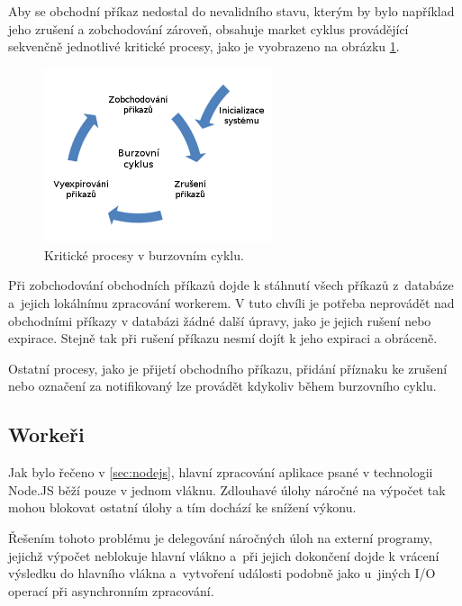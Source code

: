 \documentclass[thesis=M,czech]{FITthesis}[2012/06/26]
\begin{document}
	Aby se obchodní příkaz nedostal do nevalidního stavu, kterým by bylo například jeho zrušení a zobchodování zároveň, obsahuje market cyklus provádějící sekvenčně jednotlivé kritické procesy, jako je vyobrazeno na obrázku \ref{fig:stock_cycle}.
	 
	 
\begin{figure}[h]
	\centering
	\includegraphics[width=0.6\textwidth]{images/stock_cycle}
 	\caption[Burzovní cyklus]{Kritické procesy v burzovním cyklu.}
 	\label{fig:stock_cycle}
\end{figure}

	Při zobchodování obchodních příkazů dojde k stáhnutí všech příkazů z~databáze a~jejich lokálnímu zpracování workerem. V tuto chvíli je potřeba neprovádět nad obchodními příkazy v databázi žádné další úpravy, jako je jejich rušení nebo expirace. Stejně tak při rušení příkazu nesmí dojít k jeho expiraci a obráceně.
	
	Ostatní procesy, jako je přijetí obchodního příkazu, přidání příznaku ke zrušení nebo označení za notifikovaný lze provádět kdykoliv během burzovního cyklu.
	
\subsection{Workeři}

	Jak bylo řečeno v \ref{sec:nodejs}, hlavní zpracování aplikace psané v technologii Node.JS běží pouze v jednom vláknu. Zdlouhavé úlohy náročné na výpočet tak mohou blokovat ostatní úlohy a tím dochází ke snížení výkonu.
	
	Řešením tohoto problému je delegování náročných úloh na externí programy, jejichž výpočet neblokuje hlavní vlákno a~při jejich dokončení dojde k vrácení výsledku do hlavního vlákna a~vytvoření události podobně jako u~jiných I/O operací při asynchronním zpracování.
	
\end{document}
